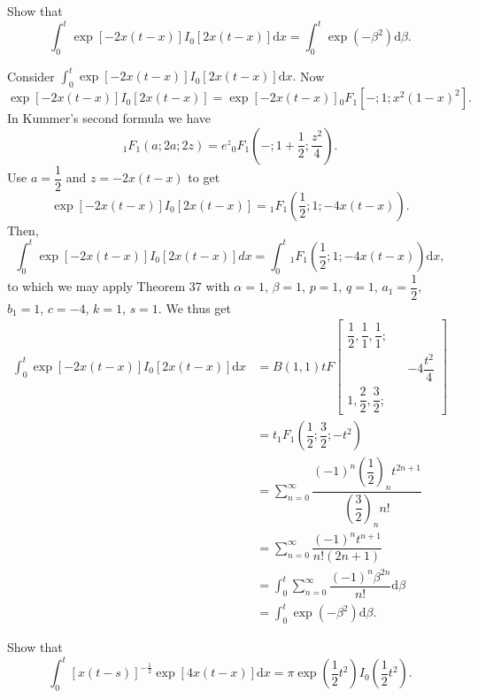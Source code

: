 \begin{problem} \label{problem20chapter6}
Show that
$$\displaystyle\int_0^t \exp[-2x(t-x)] I_0[2x(t-x)]\mathrm{d}x = \displaystyle\int_0^t \exp(-\beta^2) \mathrm{d} \beta.$$
\end{problem}
\begin{solution}
Consider $\displaystyle\int_0^t \exp [ -2x(t-x)]I_0[2x(t-x)] \mathrm{d}x.$
Now
$$\exp[-2x(t-x)]I_0[2x(t-x)] = \exp[-2x(t-x)]{}_0F_1[-;1;x^2(1-x)^2].$$
In Kummer's second formula we have
$${}_1F_1(a; 2a; 2z) = e^z {}_0F_1 \left(-; 1 + \dfrac{1}{2}; \dfrac{z^2}{4} \right).$$
Use $a = \dfrac{1}{2}$ and $z = -2x(t-x)$ to get
$$\exp[-2x(t-x)]I_0[2x(t-x)] = {}_1F_1 \left( \dfrac{1}{2}; 1 ; -4x(t-x) \right).$$
Then,
$$\displaystyle\int_0^t \exp[-2x(t-x)]I_0[2x(t-x)]dx = \displaystyle\int_0^t {}_1F_1 \left( \dfrac{1}{2}; 1 ; -4x(t-x) \right) \mathrm{d}x,$$
to which we may apply Theorem 37 with $\alpha=1$, $\beta=1$, $p=1$, $q=1$, $a_1 = \dfrac{1}{2}$, $b_1=1$, $c=-4$, $k=1$, $s=1.$ We thus get
$$\begin{array}{ll}
\displaystyle\int_0^t \exp[-2x(t-x)]I_0[2x(t-x)]\mathrm{d}x &= B(1,1)t F \left[ \begin{array}{rlr}
\dfrac{1}{2}, \dfrac{1}{1}, \dfrac{1}{1}; & & \\
& & -4 \dfrac{t^2}{4} \\
1, \dfrac{2}{2}, \dfrac{3}{2}; & & 
\end{array} \right] \\
&= t {}_1F_1 \left( \dfrac{1}{2}; \dfrac{3}{2}; -t^2 \right) \\
&= \displaystyle\sum_{n=0}^{\infty} \dfrac{(-1)^n \left( \dfrac{1}{2} \right)_n t^{2n+1}}{\left( \dfrac{3}{2} \right)_n n!} \\
&= \displaystyle\sum_{n=0}^{\infty} \dfrac{(-1)^n t^{n+1}}{n! (2n+1)} \\
&= \displaystyle\int_0^t \displaystyle\sum_{n=0}^{\infty} \dfrac{(-1)^n \beta^{2n}}{n!} \mathrm{d} \beta \\
&= \displaystyle\int_0^t \exp(-\beta^2) \mathrm{d} \beta.
\end{array}$$
\end{solution}
\begin{problem} \label{problem21chapter6}
Show that
$$\displaystyle\int_0^t [x(t-s)]^{-\frac{1}{2}} \exp[4x(t-x)]\mathrm{d}x = \pi \exp \left( \dfrac{1}{2}t^2 \right) I_0 \left( \dfrac{1}{2} t^2 \right).$$
\end{problem}
